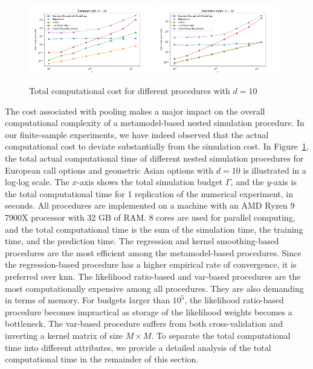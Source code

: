 \begin{figure}[ht!]
    \centering
    \includegraphics[width=0.48\textwidth]{./project1/figures/figure11a.png}
    \includegraphics[width=0.48\textwidth]{./project1/figures/figure11b.png}
    \caption{Total computational cost for different procedures with $d=10$}
\label{fig1:tcc}
\end{figure}

The cost associated with pooling makes a major impact on the overall computational complexity of a metamodel-based nested simulation procedure.
In our finite-sample experiments, we have indeed observed that the actual computational cost to deviate substantially from the simulation cost.
In Figure~\ref{fig1:tcc}, the total actual computational time of different nested simulation procedures for European call options and geometric Asian options with $d = 10$ is illustrated in a log-log scale.
The $x$-axis shows the total simulation budget $\Gamma$, and the $y$-axis is the total computational time for 1 replication of the numerical experiment, in seconds.
All procedures are implemented on a machine with an AMD Ryzen 9 7900X processor with 32 GB of RAM.
8 cores are used for parallel computing, and the total computational time is the sum of the simulation time, the training time, and the prediction time.
The regression and kernel smoothing-based procedures are the most efficient among the metamodel-based procedures.
Since the regression-based procedure has a higher empirical rate of convergence, it is preferred over \gls{knn}.
The likelihood ratio-based and \gls{var}-based procedures are the most computationally expensive among all procedures.
They are also demanding in terms of memory.
For budgets larger than $10^5$, the likelihood ratio-based procedure becomes impractical as storage of the likelihood weights becomes a bottleneck.
The \gls{var}-based procedure suffers from both cross-validation and inverting a kernel matrix of size $M \times M$.
To separate the total computational time into different attributes, we provide a detailed analysis of the total computational time in the remainder of this section.

